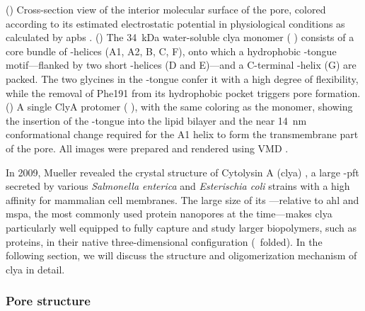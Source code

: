 \begin{figure*}[p]
{  %
  ()
  Cross-section view of the interior molecular surface of the pore, colored according to its estimated
  electrostatic potential in physiological conditions as calculated by \gls{apbs}
  \cite{Baker-2001,Baker-2005}.
  ()
  The \SI{34}{\kilo\dalton} water-soluble \gls{clya} monomer ( \cite{Wallace-2000}) consists of a
  core bundle of \ta-helices (\ta A1, \ta A2, \ta B, \ta C, \ta F), onto which a hydrophobic \tb-tongue
  motif---flanked by two short \ta-helices (\ta D and \ta E)---and a C-terminal \ta-helix (\ta G) are packed.
  The two glycines in the \tb-tongue confer it with a high degree of flexibility, while the removal of Phe191
  from its hydrophobic pocket triggers pore formation.
  ()
  A single ClyA protomer ( \cite{Peng-2019}), with the same coloring as the monomer, showing the
  insertion of the \ta-tongue into the lipid bilayer and the near \SI{14}{\nm} conformational change required
  for the \ta A1 helix to form the transmembrane part of the pore.
  All images were prepared and rendered using VMD \cite{Humphrey-1996,Stone-1998}.
  }\label{fig:clya_pore_structure}
\end{figure*}

In 2009, Mueller \etal{} revealed the crystal structure of Cytolysin A (\gls{clya}) \cite{Mueller-2009}, a
large \textalpha-\gls{pft} secreted by various \textit{Salmonella enterica} and \textit{Esterischia coli}
strains with a high affinity for mammalian cell membranes. The large size of its \lumen---relative to
\gls{ahl} and \gls{mspa}, the most commonly used protein nanopores at the time---makes \gls{clya} particularly
well equipped to fully capture and study larger biopolymers, such as proteins, in their native
three-dimensional configuration (\ie~folded). In the following section, we will discuss the structure and
oligomerization mechanism of \gls{clya} in detail.

\subsubsection{Pore structure}

